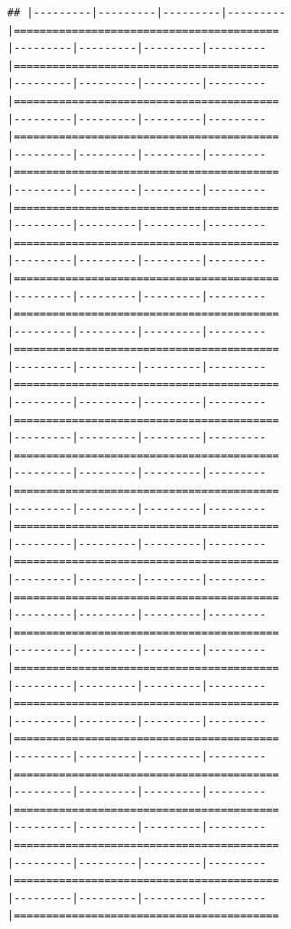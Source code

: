\documentclass[
]{article}
\begin{document}
\begin{verbatim}
## |---------|---------|---------|---------|=========================================                                          |---------|---------|---------|---------|=========================================                                          |---------|---------|---------|---------|=========================================                                          |---------|---------|---------|---------|=========================================                                          |---------|---------|---------|---------|=========================================                                          |---------|---------|---------|---------|=========================================                                          |---------|---------|---------|---------|=========================================                                          |---------|---------|---------|---------|=========================================                                          |---------|---------|---------|---------|=========================================                                          |---------|---------|---------|---------|=========================================                                          |---------|---------|---------|---------|=========================================                                          |---------|---------|---------|---------|=========================================                                          |---------|---------|---------|---------|=========================================                                          |---------|---------|---------|---------|=========================================                                          |---------|---------|---------|---------|=========================================                                          |---------|---------|---------|---------|=========================================                                          |---------|---------|---------|---------|=========================================                                          |---------|---------|---------|---------|=========================================                                          |---------|---------|---------|---------|=========================================                                          |---------|---------|---------|---------|=========================================                                          |---------|---------|---------|---------|=========================================                                          |---------|---------|---------|---------|=========================================                                          |---------|---------|---------|---------|=========================================                                          |---------|---------|---------|---------|=========================================                                          |---------|---------|---------|---------|=========================================                                          |---------|---------|---------|---------|=========================================                                          
\end{verbatim}
\end{document}

